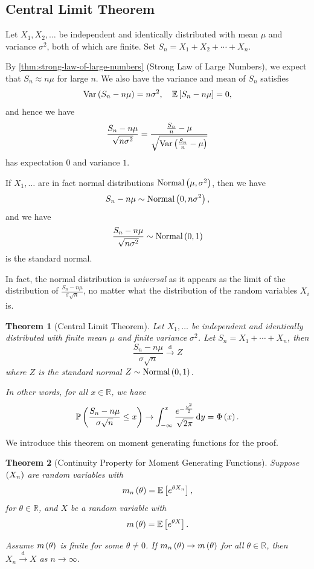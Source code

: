 \documentclass{article}
\newtheorem{theorem}{Theorem}[section]
\theoremstyle{definition}
\theoremstyle{remark}
\newcommand{\RR}{\mathbb{R}}
\newcommand{\Prob}{\mathbb{P}}
\newcommand{\Expt}{\mathbb{E}}
\newcommand{\minusinfty}{-\infty}
\newcommand{\flatfrac}[2]{\frac{#1}{#2}}
\newcommand{\toDist}{\xrightarrow{\mathrm{d}}}
\newcommand{\sNormCdf}{\Phi}
\newcommand{\Var}{\operatorname{Var}}
\newcommand{\Normal}{\operatorname{Normal}}
\begin{document}
\subsection{Central Limit Theorem}

Let \(X_1, X_2, \ldots\) be independent and identically distributed with mean \(\mu\) and variance \(\sigma^2\), both of which are finite. Set \(S_n = X_1 + X_2 + \cdots + X_n\).

By \autoref{thm:strong-law-of-large-numbers} (Strong Law of Large Numbers), we expect that \(S_n \approx n \mu\) for large \(n\). We also have the variance and mean of \(S_n\) satisfies
\[
    \Var\pqty{S_n - n \mu} = n \sigma^2, \quad \Expt\bqty{S_n - n \mu} = 0,
\]
and hence we have
\[
    \frac{S_n - n \mu}{\sqrt{n \sigma^2}} = \frac{\frac{S_n}{n} - \mu}{\sqrt{\Var\pqty{\frac{S_n}{n} - \mu}}}
\]
has expectation \(0\) and variance \(1\).

If \(X_1, \ldots\) are in fact normal distributions \(\Normal\pqty{\mu, \sigma^2}\), then we have
\[
    S_n - n \mu \sim \Normal\pqty{0, n \sigma^2},
\]
and we have
\[
    \frac{S_n - n \mu}{\sqrt{n \sigma^2}} \sim \Normal\pqty{0, 1}
\]
is the standard normal.

In fact, the normal distribution is \emph{universal} as it appears as the limit of the distribution of \(\frac{S_n - n \mu}{\sigma \sqrt{n}}\), no matter what the distribution of the random variables \(X_i\) is.

\begin{theorem}[Central Limit Theorem]
    \label{thm:clt}%
    Let \(X_1, \ldots\) be independent and identically distributed with finite mean \(\mu\) and finite variance \(\sigma^2\). Let \(S_n = X_1 + \cdots + X_n\), then
    \[
        \frac{S_n - n \mu}{\sigma \sqrt{n}} \toDist Z
    \]
    where \(Z\) is the standard normal \(Z \sim \Normal\pqty{0, 1}\).

    In other words, for all \(x \in \RR\), we have
    \[
        \Prob\pqty{\frac{S_n - n \mu}{\sigma \sqrt{n}} \leq x} \to \int_{\minusinfty}^{x}  \frac{e^{- \flatfrac{y^2}{2}}}{\sqrt{2 \pi}} \dd{y} = \sNormCdf\pqty{x}.
    \]
\end{theorem}

We introduce this theorem on moment generating functions for the proof.

\begin{theorem}[Continuity Property for Moment Generating Functions]
    \label{thm:continuity-property-mgf}%
    Suppose \(\left(X_n\right)\) are random variables with
    \[
        m_n \pqty{\theta} = \Expt\bqty{e^{\theta X_n}},
    \]
    for \(\theta \in \RR\), and \(X\) be a random variable with
    \[
        m \pqty{\theta} = \Expt\bqty{e^{\theta X}}.
    \]

    Assume \(m\left(\theta\right)\) is finite for some \(\theta \neq 0\). If \(m_n \left(\theta\right) \to m\left(\theta\right)\) for all \(\theta \in \RR\), then \(X_n \toDist X\) as \(n \to \infty\).
\end{theorem}
\end{document}
